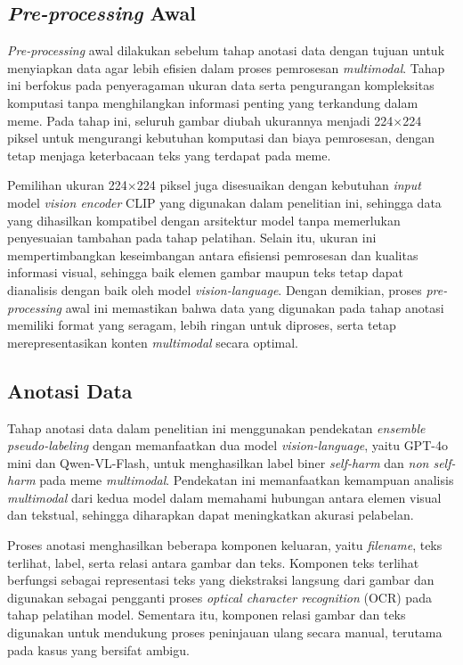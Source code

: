\subsection{\textit{Pre-processing} Awal} \label{subsec:preprocessing_awal}
\textit{Pre-processing} awal dilakukan sebelum tahap anotasi data dengan tujuan untuk menyiapkan data agar lebih efisien dalam proses pemrosesan \textit{multimodal}. Tahap ini berfokus pada penyeragaman ukuran data serta pengurangan kompleksitas komputasi tanpa menghilangkan informasi penting yang terkandung dalam meme. Pada tahap ini, seluruh gambar diubah ukurannya menjadi 224$\times$224 piksel untuk mengurangi kebutuhan komputasi dan biaya pemrosesan, dengan tetap menjaga keterbacaan teks yang terdapat pada meme.

Pemilihan ukuran 224$\times$224 piksel juga disesuaikan dengan kebutuhan \textit{input} model \textit{vision encoder} CLIP yang digunakan dalam penelitian ini, sehingga data yang dihasilkan kompatibel dengan arsitektur model tanpa memerlukan penyesuaian tambahan pada tahap pelatihan. Selain itu, ukuran ini mempertimbangkan keseimbangan antara efisiensi pemrosesan dan kualitas informasi visual, sehingga baik elemen gambar maupun teks tetap dapat dianalisis dengan baik oleh model \textit{vision-language}. Dengan demikian, proses \textit{pre-processing} awal ini memastikan bahwa data yang digunakan pada tahap anotasi memiliki format yang seragam, lebih ringan untuk diproses, serta tetap merepresentasikan konten \textit{multimodal} secara optimal.

\subsection{Anotasi Data} \label{subsec:anotasi_data}
Tahap anotasi data dalam penelitian ini menggunakan pendekatan \textit{ensemble pseudo-labeling} dengan memanfaatkan dua model \textit{vision-language}, yaitu GPT-4o mini dan Qwen-VL-Flash, untuk menghasilkan label biner \textit{self-harm} dan \textit{non self-harm} pada meme \textit{multimodal}. Pendekatan ini memanfaatkan kemampuan analisis \textit{multimodal} dari kedua model dalam memahami hubungan antara elemen visual dan tekstual, sehingga diharapkan dapat meningkatkan akurasi pelabelan.

Proses anotasi menghasilkan beberapa komponen keluaran, yaitu \textit{filename}, teks terlihat, label, serta relasi antara gambar dan teks. Komponen teks terlihat berfungsi sebagai representasi teks yang diekstraksi langsung dari gambar dan digunakan sebagai pengganti proses \textit{optical character recognition} (OCR) pada tahap pelatihan model. Sementara itu, komponen relasi gambar dan teks digunakan untuk mendukung proses peninjauan ulang secara manual, terutama pada kasus yang bersifat ambigu.

